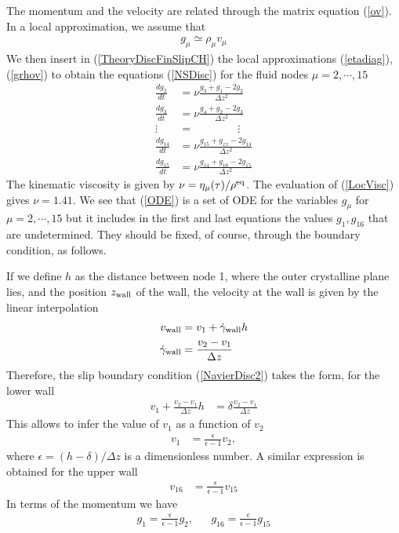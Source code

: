\documentclass[b5paper,openright,10pt]{book}
\begin{document}
The momentum and the velocity  are related through the matrix equation
(\ref{ov}). In a local approximation, we assume
that
\begin{align}
  g_\mu\simeq\rho_\mu{v}_\mu
\label{grhov}
\end{align}
We  then  insert  in (\ref{TheoryDiscFinSlipCH})  the  local  approximations
(\ref{etadiag}), (\ref{grhov}) to  obtain the equations (\ref{NSDisc})
for the fluid nodes $\mu=2,\cdots,15$
\begin{align}
  \frac{d g_2}{dt}&= \nu\frac{g_3+g_1-2g_2}{\Delta z^2}
\nonumber\\
  \frac{d g_3}{dt}&=\nu\frac{g_4+g_2-2g_3}{\Delta z^2}
\nonumber\\
\vdots\;\;&=\quad\quad\quad\quad\vdots
\nonumber\\
  \frac{d g_{14}}{dt}&=\nu\frac{ g_{15}+ g_{xz}-2g_{14}}{\Delta z^2}
\nonumber\\
  \frac{d g_{15}}{dt}&=
\nu\frac{g_{14}+g_{16}-2g_{15}}{\Delta z^2}
\label{ODE}
\end{align}
The kinematic viscosity is given by $\nu=\eta_\mu(\tau)/\rho^{\rm eq}$.
The evaluation of (\ref{LocVisc}) gives $\nu=1.41$.
We see that 
(\ref{ODE}) is a set of ODE for the variables $g_\mu$ for
$\mu=2,\cdots,15$ but it includes in the first and last equations the
values $g_1,g_{16}$ that are undetermined. They
should be fixed, of course, through the boundary condition, as follows.

If  we define  $h$ as  the distance  between node  1, where  the outer
crystalline plane  lies, and the  position $z_{\rm wall}$ of  the wall,
the velocity at the wall is given by the linear interpolation
\begin{align}
{v}_{\rm wall}&= v_1+\dot{{\gamma}}_{\rm wall} h
\nonumber\\
\dot{{\gamma}}_{\rm wall}&=\frac{v_2-v_1}{\Delta z}
\end{align}
Therefore, the  slip boundary condition (\ref{NavierDisc2})  takes the
form, for the lower wall
\begin{align}
  v_1+\frac{v_2-v_1}{\Delta z} h&=\delta \frac{v_2-v_1}{\Delta z}
\end{align}
This allows to infer the value of $v_1$ as a function of $v_2$ 
\begin{align}
  v_1&=\frac{\epsilon}{\epsilon-1}v_2,
\end{align}
where $\epsilon=(h-\delta)/\Delta z$ is a dimensionless number.
A similar expression is obtained for the upper wall
\begin{align}
  v_{16}&=\frac{\epsilon}{\epsilon-1}v_{15}
\end{align}
In terms of the momentum we have
\begin{align}
  g_1=\frac{\epsilon}{\epsilon-1}g_2, &&
  g_{16}=\frac{\epsilon}{\epsilon-1}g_{15}
\end{align}
\end{document}
